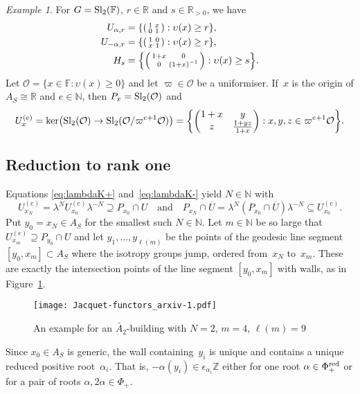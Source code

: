\documentclass{amsart}
\theoremstyle{remark}
\newtheorem{example}[theorem]{Example}
\theoremstyle{definition}
\newcommand*{\opp}[1]{\overline{#1}}%
\newcommand*{\N}{\mathbb N}%
\newcommand*{\Z}{\mathbb Z}%
\newcommand*{\R}{\mathbb R}%
\newcommand*{\F}{\mathbb F}%
\newcommand*{\valu}{\upsilon}%
\newcommand*{\Sl}{\textup{Sl}}%
\newcommand*{\ST}{S}%
\newcommand*{\Un}{U}%
\newcommand*{\UC}[1]{U_{#1}}%
\newcommand*{\integ}{\mathcal O}%
\newcommand*{\unif}{\varpi}%
\newcommand*{\Phr}{\Phi^\textup{red}}%
\newcommand*{\twomatrix}[4]{\begin{pmatrix}#1&#2\\#3&#4\end{pmatrix}}
\newcommand*{\stwomatrix}[4]{\left(\begin{smallmatrix}#1&#2\\#3&#4\end{smallmatrix}\right)}
\begin{document}
\begin{example}
  \label{ex:SL2U}
  For \(G = \Sl_2 (\F)\), \(r \in \R\) and \(s \in \R_{>0}\), we have
  \begin{align*}
    \Un_{\alpha,r} &= \{ \stwomatrix{1}{x}{0}{1} : \valu (x) \ge r \}, \\
    \Un_{-\alpha,r} &= \{ \stwomatrix{1}{0}{x}{1} : \valu (x) \ge r \}, \\
    H_s &= \Bigl\{ \stwomatrix{1+x}{0}{0}{(1+x)^{-1}} : \valu (x) \ge s \Bigr\}.
  \end{align*}
  Let \(\integ = \{ x \in \F : \valu (x) \ge 0 \}\) and let \(\unif \in \integ\) be a uniformiser.  If~\(x\) is the origin of \(A_\ST \cong \R\) and \(e \in \N\), then \(P_x = \Sl_2 (\integ)\) and
  \[
  \UC{x}^{(e)} = \ker \bigl( \Sl_2 (\integ) \to \Sl_2 (\integ / \unif^{e+1} \integ) \bigr) =
  \biggl\{ \twomatrix{1+x}{y}{z}{\frac{1+yz}{1+x}} : x,y,z \in \unif^{e+1} \integ\biggr\}.
  \]
\end{example}


\subsection{Reduction to rank one}

Equations \eqref{eq:lambdaK+} and~\eqref{eq:lambdaK-} yield \(N\in\N\) with
\[
\UC{x_N}^{(e)} = \lambda^N \UC{x_0}^{(e)} \lambda^{-N} \supseteq P_{x_0} \cap U
\quad \text{and} \quad
P_{x_N} \cap \opp{U} = \lambda^N (P_{x_0} \cap \opp{U}) \lambda^{-N} \subseteq \UC{x_0}^{(e)}.
\]
Put \(y_0 = x_N \in A_\ST\) for the smallest such \(N \in \N\).  Let \(m \in \N\) be so large that \(\UC{x_m}^{(e)} \supseteq P_{y_0} \cap U\) and let \(y_1, \dotsc, y_{\ell (m)}\) be the points of the geodesic line segment \([y_0,x_m] \subset A_\ST\) where the isotropy groups jump, ordered from~\(x_N\) to~\(x_m\).  These are exactly the intersection points of the line segment \([y_0,x_m]\) with walls, as in Figure~\ref{fig:ys}.
\begin{figure}[h]
\texttt{[image: Jacquet-functors\_arxiv-1.pdf]}
  \caption{An example for an \(\widetilde{A_2}\)-building with \(N=2\), \(m=4\), \(\ell(m)=9\)}
  \label{fig:ys}
\end{figure}
Since \(x_0 \in A_\ST\) is generic, the wall containing~\(y_i\) is unique and contains a unique reduced positive root~\(\alpha_i\).  That is, \(-\alpha (y_i) \in \epsilon_{\alpha_i} \Z\) either for one root \(\alpha \in \Phr_+\) or for a pair of roots \(\alpha, 2\alpha \in \Phi_+\).
\end{document}
